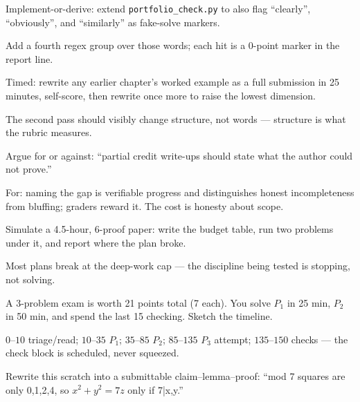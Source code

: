 \begin{exercise}[medium]\label{exr:ea7}
Implement-or-derive: extend \texttt{portfolio\_check.py} to also flag
``clearly'', ``obviously'', and ``similarly'' as fake-solve markers.
\end{exercise}
\begin{solution}
Add a fourth regex group over those words; each hit is a 0-point
marker in the report line.
\end{solution}
\begin{exercise}[hard]\label{exr:ea8}
Timed: rewrite any earlier chapter's worked example as a full
submission in 25 minutes, self-score, then rewrite once more to raise
the lowest dimension.
\end{exercise}
\begin{solution}
The second pass should visibly change structure, not words ---
structure is what the rubric measures.
\end{solution}
\begin{exercise}[hard]\label{exr:ea9}
Argue for or against: ``partial credit write-ups should state what the
author could not prove.''
\end{exercise}
\begin{solution}
For: naming the gap is verifiable progress and distinguishes honest
incompleteness from bluffing; graders reward it. The cost is honesty
about scope.
\end{solution}
\begin{exercise}[hard]\label{exr:ea10}
Simulate a 4.5-hour, 6-proof paper: write the budget table, run two
problems under it, and report where the plan broke.
\end{exercise}
\begin{solution}
Most plans break at the deep-work cap --- the discipline being tested
is stopping, not solving.
\end{solution}
\begin{exercise}[easy]\label{exr:ea11}
A 3-problem exam is worth 21 points total (7 each). You solve $P_1$ in
25 min, $P_2$ in 50 min, and spend the last 15 checking. Sketch the
timeline.
\end{exercise}
\begin{solution}
$0$--$10$ triage/read; $10$--$35$ $P_1$; $35$--$85$ $P_2$;
$85$--$135$ $P_3$ attempt; $135$--$150$ checks --- the check block is
scheduled, never squeezed.
\end{solution}
\begin{exercise}[medium]\label{exr:ea12}
Rewrite this scratch into a submittable claim--lemma--proof: ``mod 7
squares are only 0,1,2,4, so $x^2+y^2=7z$ only if 7|x,y.''
\end{exercise}
